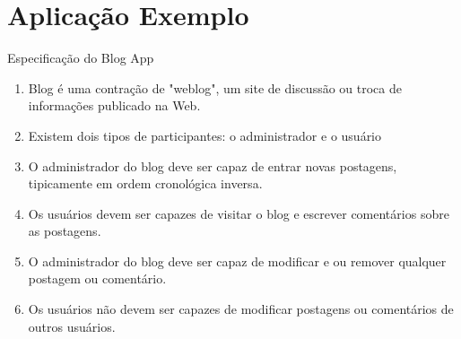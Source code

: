 \section{Aplicação Exemplo}
\begin{frame}{Especificação do Blog App}
	\begin{enumerate}
		\item Blog é uma contração de "weblog", um site de discussão ou troca de informações
		publicado na Web.
		\item Existem dois tipos de participantes: o administrador e o usuário
		\item O administrador do blog deve ser capaz de entrar novas postagens, tipicamente
		em ordem cronológica inversa.
		\item Os usuários devem ser capazes de visitar o blog e escrever comentários sobre
		as postagens.
		\item O administrador do blog deve ser capaz de modificar e ou remover qualquer postagem
		ou comentário.
		\item Os usuários não devem ser capazes de modificar postagens ou comentários de outros usuários.
	\end{enumerate}
\end{frame}

